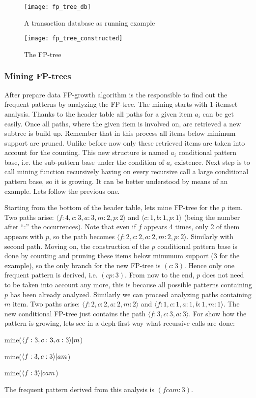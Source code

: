 \begin{figure}
  \centering
  \texttt{[image: fp\_tree\_db]}
  \caption{A transaction database as running example}
  \label{fig:fp_tree_db}
\end{figure}

\begin{figure}
  \centering
  \texttt{[image: fp\_tree\_constructed]}
  \caption{The FP-tree}
  \label{fig:fp_tree_constructed}
\end{figure}

\subsubsection{Mining FP-trees}

After prepare data FP-growth algorithm is the responsible to find out the
frequent patterns by analyzing the FP-tree. The mining starts with 1-itemset
analysis. Thanks to the header table all paths for a given item $a_{i}$ can be get
easily. Once all paths, where the given item is involved on, are retrieved a new 
subtree is build up. Remember that in this process all items below minimum support 
are pruned. Unlike before now only these retrieved items are taken into account 
for the counting. This new structure is named $a_{i}$ conditional pattern base,
i.e. the sub-pattern base under the condition of $a_{i}$ existence. Next step is
to call mining function recursively having on every recursive call a large
conditional pattern base, so it is growing. It can be better understood by means
of an example. Lets follow the previous one.

Starting from the bottom of the header table, lets mine FP-tree for the $p$ item. Two
paths arise: $\langle f:4,c:3,a:3,m:2,p:2 \rangle$ and $\langle c:1, b:1, p:1
\rangle$ (being the number after ``:'' the occurrences). Note that even if $f$
appears 4 times, only 2 of them appears with $p$, so the path becomes $\langle 
f:2,c:2,a:2,m:2,p:2 \rangle$. Similarly with second path. Moving on, the
construction of the $p$ conditional pattern base is done by counting and pruning
these items below minumum support (3 for the example), so the only branch for the new FP-tree is
$(c:3)$. Hence only one frequent pattern is derived, i.e. $(cp:3)$. From now to
the end, $p$ does not need to be taken into account any more, this is because
all possible patterns containing $p$ has been already analyzed. Similarly we can proceed analyzing paths containing $m$ item. Two paths arise: 
$\langle f:2,c:2,a:2,m:2 \rangle$ and $\langle f:1,c:1,a:1,b:1,m:1 \rangle$. The
new conditional FP-tree just contains the path $\langle f:3,c:3,a:3 \rangle$.
For show how the pattern is growing, lets see in a deph-first way what
recursive calls are done:
\begin{enumerate*}[label=(\roman*)]
  \item mine($\langle f:3,c:3,a:3 \rangle \text{\textbar} m$)
  \item mine($\langle f:3,c:3 \rangle \text{\textbar} am$)
  \item mine($\langle f:3 \rangle \text{\textbar} cam$)
\end{enumerate*}
The frequent pattern derived from this analysis is $(fcam:3)$.

